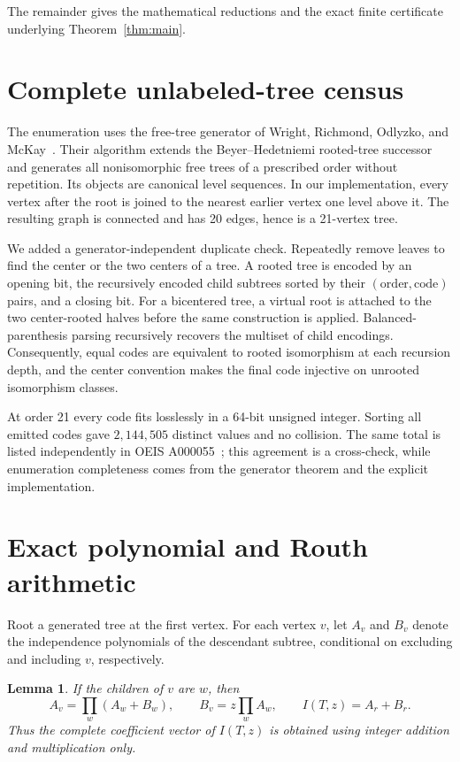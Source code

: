 \documentclass[11pt]{article}
\newtheorem{lemma}[theorem]{Lemma}
\begin{document}
The remainder gives the mathematical reductions and the exact finite
certificate underlying Theorem~\ref{thm:main}.

\section{Complete unlabeled-tree census}

The enumeration uses the free-tree generator of Wright, Richmond, Odlyzko,
and McKay~\cite{WrightRichmondOdlyzkoMcKay1986}.  Their algorithm extends the
Beyer--Hedetniemi rooted-tree successor and generates all nonisomorphic free
trees of a prescribed order without repetition.  Its objects are canonical
level sequences.  In our implementation, every vertex after the root is
joined to the nearest earlier vertex one level above it.  The resulting graph
is connected and has 20 edges, hence is a 21-vertex tree.

We added a generator-independent duplicate check.  Repeatedly remove leaves
to find the center or the two centers of a tree.  A rooted tree is encoded by
an opening bit, the recursively encoded child subtrees sorted by their
$(\text{order},\text{code})$ pairs, and a closing bit.  For a bicentered tree,
a virtual root is attached to the two center-rooted halves before the same
construction is applied.  Balanced-parenthesis parsing recursively recovers
the multiset of child encodings.  Consequently, equal codes are equivalent to
rooted isomorphism at each recursion depth, and the center convention makes
the final code injective on unrooted isomorphism classes.

At order 21 every code fits losslessly in a 64-bit unsigned integer.  Sorting
all emitted codes gave $2{,}144{,}505$ distinct values and no collision.  The
same total is listed independently in OEIS A000055~\cite{OEISA000055}; this
agreement is a cross-check, while enumeration completeness comes from the
generator theorem and the explicit implementation.

\section{Exact polynomial and Routh arithmetic}

Root a generated tree at the first vertex.  For each vertex $v$, let $A_v$
and $B_v$ denote the independence polynomials of the descendant subtree,
conditional on excluding and including $v$, respectively.

\begin{lemma}\label{lem:dp}
If the children of $v$ are $w$, then
\[
 A_v=\prod_w(A_w+B_w),\qquad
 B_v=z\prod_w A_w,
 \qquad I(T,z)=A_r+B_r.
\]
Thus the complete coefficient vector of $I(T,z)$ is obtained using integer
addition and multiplication only.
\end{lemma}
\end{document}
